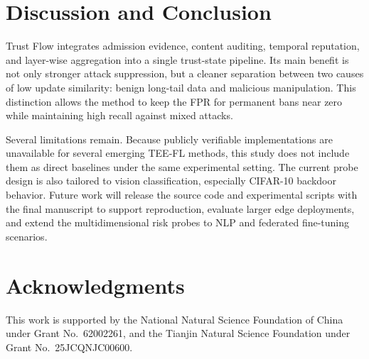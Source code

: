 \documentclass[runningheads,orivec]{llncs}
\begin{document}
\section{Discussion and Conclusion}

Trust Flow integrates admission evidence, content auditing, temporal reputation, and layer-wise aggregation into a single trust-state pipeline. Its main benefit is not only stronger attack suppression, but a cleaner separation between two causes of low update similarity: benign long-tail data and malicious manipulation. This distinction allows the method to keep the FPR for permanent bans near zero while maintaining high recall against mixed attacks.

Several limitations remain. Because publicly verifiable implementations are unavailable for several emerging TEE-FL methods, this study does not include them as direct baselines under the same experimental setting. The current probe design is also tailored to vision classification, especially CIFAR-10 backdoor behavior. Future work will release the source code and experimental scripts with the final manuscript to support reproduction, evaluate larger edge deployments, and extend the multidimensional risk probes to NLP and federated fine-tuning scenarios.

\section*{Acknowledgments}
This work is supported by the National Natural Science Foundation of China under Grant No.~62002261, and the Tianjin Natural Science Foundation under Grant No.~25JCQNJC00600.
\end{document}
